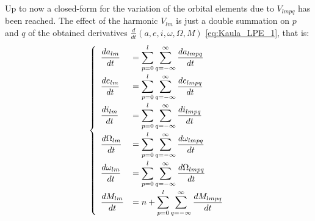 				\paragraph{  \\}
				\indent Up to now a closed-form for the variation of the orbital elements due to $V_{lmpq}$ has been reached. The effect of the harmonic $V_{lm}$ is just a double summation on $p$ and $q$ of the obtained derivatives $\frac{d}{dt}(a, e, i, \omega, \Omega, M)$ \eqref{eq:Kaula_LPE_1}, that is:
				\begin{equation}
				\left\{ \begin{array}{llll}
				\dfrac{da_{lm}}{dt} 		& = \displaystyle\sum_{p = 0}^{l} \displaystyle\sum_{q = -\infty}^{\infty} \dfrac{da_{lmpq}}{dt} \\[1.2 em]
				\dfrac{de_{lm}}{dt} 		& = \displaystyle\sum_{p = 0}^{l} \displaystyle\sum_{q = -\infty}^{\infty} \dfrac{de_{lmpq}}{dt} \\[1.2 em]
				\dfrac{di_{lm}}{dt} 		& = \displaystyle\sum_{p = 0}^{l} \displaystyle\sum_{q = -\infty}^{\infty} \dfrac{di_{lmpq}}{dt} \\[1.2 em]
				\dfrac{d\Omega_{lm}}{dt} 	& = \displaystyle\sum_{p = 0}^{l} \displaystyle\sum_{q = -\infty}^{\infty} \dfrac{d\omega_{lmpq}}{dt}\\[1.2 em]
				\dfrac{d\omega_{lm}}{dt} 	& = \displaystyle\sum_{p = 0}^{l} \displaystyle\sum_{q = -\infty}^{\infty} \dfrac{d\Omega_{lmpq}}{dt} \\[1.2 em]
				\dfrac{dM_{lm}}{dt}		& = n + \displaystyle\sum_{p = 0}^{l} \displaystyle\sum_{q = -\infty}^{\infty} \dfrac{dM_{lmpq}}{dt}
				\end{array}\right.
				\label{eq:Kaula_LPE_2}
				\end{equation}
